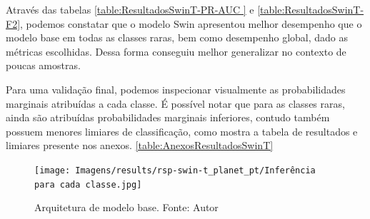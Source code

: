 Através das tabelas \ref{table:ResultadosSwinT-PR-AUC } e \ref{table:ResultadosSwinT-F2}, podemos constatar que o modelo Swin apresentou melhor desempenho que o modelo base em todas as classes raras, bem como desempenho global, dado as métricas escolhidas. Dessa forma conseguiu melhor generalizar no contexto de poucas amostras.

Para uma validação final, podemos inspecionar visualmente as probabilidades marginais atribuídas a cada classe. É possível notar que para as classes raras, ainda são atribuídas probabilidades marginais inferiores, contudo também possuem menores limiares de classificação, como mostra a tabela de resultados e limiares presente nos anexos. \ref{table:AnexosResultadosSwinT}

\begin{figure}[!ht]
    \centering
    \texttt{[image: Imagens/results/rsp-swin-t\_planet\_pt/Inferência para cada classe.jpg]}
    \caption{ Arquitetura de modelo base.
    Fonte: Autor}
    \label{fig:InferenciaClassesSwin}
\end{figure}  